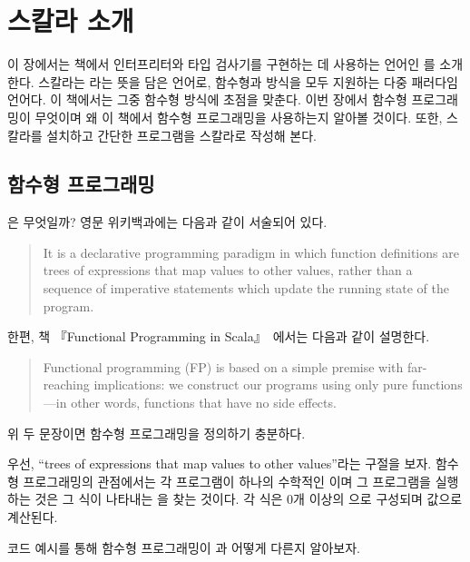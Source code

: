 \chapter{스칼라 소개}

이 장에서는 책에서 인터프리터와 타입 검사기를 구현하는 데 사용하는 언어인
를 소개한다. 스칼라는 라는 뜻을
담은 언어로, 함수형과  방식을 모두 지원하는 다중
패러다임 언어다. 이 책에서는 그중 함수형 방식에 초점을 맞춘다. 이번 장에서
함수형 프로그래밍이 무엇이며 왜 이 책에서 함수형 프로그래밍을 사용하는지 알아볼
것이다. 또한, 스칼라를 설치하고 간단한 프로그램을 스칼라로 작성해 본다.

\section{함수형 프로그래밍}

은 무엇일까? 영문 위키백과에는 다음과
같이 서술되어 있다.

\begin{quote}
It is a declarative programming paradigm in which function definitions are trees
of expressions that map values to other values, rather than a sequence of
imperative statements which update the running state of the program.
\end{quote}

한편, 책 『Functional Programming in Scala』~\cite{fp-in-scala}에서는 다음과 같이 설명한다.

\begin{quote}
Functional programming (FP) is based on a simple premise with far-reaching
implications: we construct our programs using only pure functions---in other words,
functions that have no side effects.
\end{quote}

위 두 문장이면 함수형 프로그래밍을 정의하기 충분하다.

우선, ``trees of expressions that map values to other values''라는 구절을 보자.
함수형 프로그래밍의 관점에서는 각 프로그램이 하나의 수학적인
이며
그 프로그램을 실행하는 것은 그 식이 나타내는 을 찾는 것이다. 각 식은
0개 이상의 으로 구성되며 값으로 계산된다.

코드 예시를 통해 함수형 프로그래밍이 과
어떻게 다른지 알아보자.


